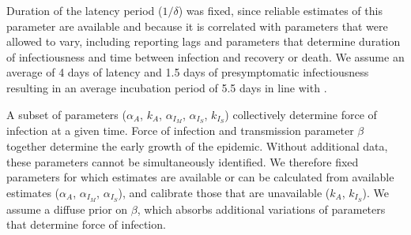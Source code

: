 \documentclass[11pt]{article}
\begin{document}
Duration of the latency period ($1/\delta$) was fixed, since reliable estimates of this parameter are available and because it is correlated with parameters that were allowed to vary, including reporting lags and parameters that determine duration of infectiousness and time between infection and recovery or death. We assume an average of 4 days of latency \citep{li2020substantial, salje2020estimating} and 1.5 days of presymptomatic infectiousness \citep{wei2020presymptomatic} resulting in an average incubation period of 5.5 days in line with \citep{lauer2020incubation, bi2020epidemiology, li2020early, linton2020incubation, he2020estimation, salje2020estimating}. 

A subset of parameters ($\alpha_A$, $k_A$, $\alpha_{I_M}$, $\alpha_{I_S}$, $k_{I_S}$) collectively determine force of infection at a given time. Force of infection and transmission parameter $\beta$ together
determine the early growth of the epidemic. Without additional data, these parameters cannot be simultaneously identified. We therefore fixed parameters for which estimates are available or can be calculated from available estimates ($\alpha_A$, $\alpha_{I_M}$, $\alpha_{I_S}$), and calibrate those that are unavailable ($k_A$, $k_{I_S}$). We assume a diffuse prior on $\beta$, which absorbs additional variations of parameters that determine force of infection. 
\end{document}
